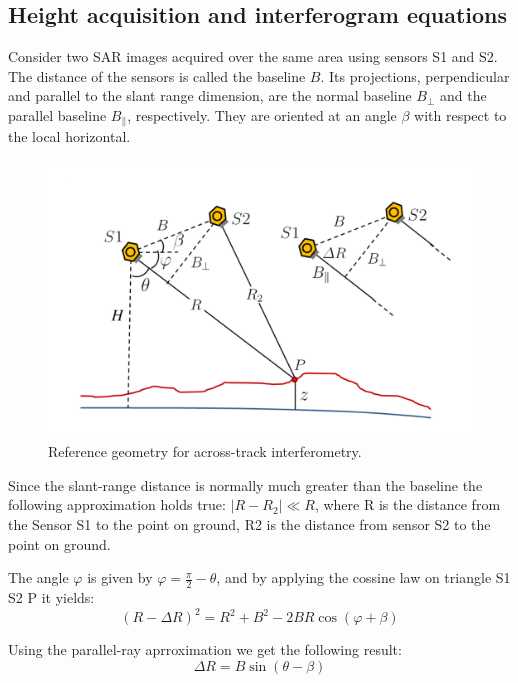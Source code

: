 \subsection{Height acquisition and interferogram equations}
Consider two SAR images acquired over the same area using sensors S1 and S2. The distance of the sensors is called the baseline $B$. Its projections, perpendicular and parallel to the slant range dimension, are the normal baseline $B_{\perp}$ and the parallel baseline $B_{\parallel}$, respectively. They are oriented at an angle $\beta$ with respect to the local horizontal.

\begin{figure}[H]
    \centering
    \includegraphics[width=\linewidth]{Cap1/int.png}
    \caption{Reference geometry for across-track interferometry. \cite{Paolathesis}}
    \label{fig:reference_geometry}
\end{figure}

Since the slant-range distance is normally much greater than the baseline the following approximation holds true: $|R - R_2| \ll R$, where R is the distance from the Sensor S1 to the point on ground, R2 is the distance from sensor S2 to the point on ground.

The angle $\varphi$ is given by $\varphi = \frac{\pi}{2} - \theta$, 
and by applying the cossine law on triangle S1 S2 P it yields:
\begin{equation}
    (R-\Delta R) ^2 = R^2 + B^2 - 2BR \cos(\varphi + \beta)
\end{equation}

Using the parallel-ray aprroximation we get the following result:
\begin{equation}
    \Delta R = B \sin(\theta - \beta)
\end{equation}

